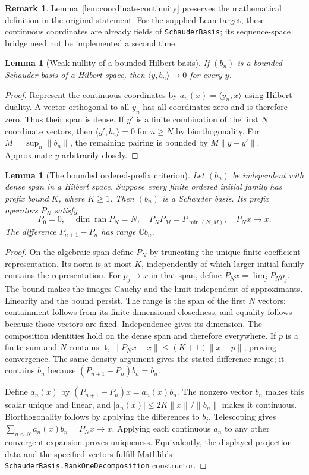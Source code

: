 \documentclass[reqno,a4paper,12pt]{amsart}
\newtheorem{lemma}[theorem]{Lemma}
\theoremstyle{definition}
\newtheorem{remark}[theorem]{Remark}
\newcommand{\C}{\mathbb C}
\newcommand{\ip}[2]{\langle #1,#2\rangle}
\newcommand{\ran}{\operatorname{ran}}
\newcommand{\ml}[1]{\nolinkurl{#1}}
\begin{document}
\begin{remark}
Lemma~\ref{lem:coordinate-continuity} preserves the mathematical
definition in the original statement. For the supplied Lean target,
these continuous coordinates are already fields of
\ml{SchauderBasis}; its sequence-space bridge need not be implemented
a second time.
\end{remark}

\begin{lemma}[Weak nullity of a bounded Hilbert basis]\label{lem:weak-null}
If $(b_n)$ is a bounded Schauder basis of a Hilbert space, then
$\ip{y}{b_n}\to0$ for every $y$.
\end{lemma}
\begin{proof}
Represent the continuous coordinates by $a_n(x)=\ip{y_n}{x}$ using
Hilbert duality. A vector orthogonal to all $y_n$ has all coordinates
zero and is therefore zero. Thus their span is dense.
If $y'$ is a finite combination of the first $N$ coordinate vectors,
then $\ip{y'}{b_n}=0$ for $n\ge N$ by biorthogonality.
For $M=\sup_n\|b_n\|$, the remaining pairing is bounded by
$M\|y-y'\|$. Approximate $y$ arbitrarily closely.
\end{proof}

\begin{lemma}[The bounded ordered-prefix criterion]\label{lem:basis-criterion}
Let $(b_n)$ be independent with dense span in a Hilbert space.
Suppose every finite ordered initial family has prefix bound $K$,
where $K\ge1$. Then $(b_n)$ is a Schauder basis.
Its prefix operators $P_N$ satisfy
\[
 P_0=0,\quad \dim\ran P_N=N,\quad
 P_NP_M=P_{\min(N,M)},\quad P_Nx\to x.
\]
The difference $P_{n+1}-P_n$ has range $\C b_n$.
\end{lemma}
\begin{proof}
On the algebraic span define $P_N$ by truncating the unique finite
coefficient representation. Its norm is at most $K$, independently of
which larger initial family contains the representation.
For $p_j\to x$ in that span, define $P_Nx=\lim_jP_Np_j$.
The bound makes the images Cauchy and the limit independent of
approximants. Linearity and the bound persist.
The range is the span of the first $N$ vectors: containment follows
from its finite-dimensional closedness, and equality follows because
those vectors are fixed. Independence gives its dimension.
The composition identities hold on the dense span and therefore
everywhere. If $p$ is a finite sum and $N$ contains it,
$\|P_Nx-x\|\le(K+1)\|x-p\|$, proving convergence.
The same density argument gives the stated difference range; it
contains $b_n$ because $(P_{n+1}-P_n)b_n=b_n$.

Define $a_n(x)$ by $(P_{n+1}-P_n)x=a_n(x)b_n$.
The nonzero vector $b_n$ makes this scalar unique and linear, and
$|a_n(x)|\le2K\|x\|/\|b_n\|$ makes it continuous.
Biorthogonality follows by applying the differences to $b_j$.
Telescoping gives $\sum_{n<N}a_n(x)b_n=P_Nx\to x$.
Applying each continuous $a_n$ to any other convergent expansion proves
uniqueness. Equivalently, the displayed projection data and the
specified vectors fulfill Mathlib's
\ml{SchauderBasis.RankOneDecomposition} constructor.
\end{proof}
\end{document}
